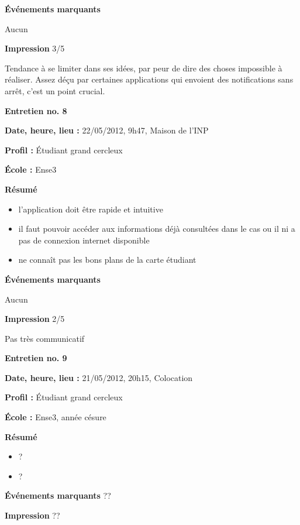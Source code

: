 \documentclass[a4paper, 11px]{article}
\begin{document}
\textbf{Événements marquants}

Aucun

\textbf{Impression} 3/5

Tendance à se limiter dans ses idées, par peur de dire des choses impossible à réaliser. Assez déçu par certaines applications qui envoient des notifications sans arrêt, c'est un point crucial.


\vspace{.3cm}
 \textbf {\large Entretien no. 8}

\textbf{Date, heure, lieu : }
22/05/2012, 9h47, Maison de l'INP

\textbf{Profil : }
Étudiant grand cercleux


\textbf{École : }
Ense3

\textbf{Résumé}
	\begin{itemize}
		\item l'application doit être rapide et intuitive
		\item il faut pouvoir accéder aux informations déjà consultées dans le cas ou il ni a pas de connexion internet disponible
		\item ne connaît pas les bons plans de la carte étudiant
	\end{itemize}
\vspace{.25cm}

\textbf{Événements marquants}

Aucun

\textbf{Impression} 2/5

Pas très communicatif



\vspace{.3cm}

 \textbf {\large Entretien no. 9}

\textbf{Date, heure, lieu : }
21/05/2012, 20h15, Colocation

\textbf{Profil : }
Étudiant grand cercleux

\textbf{École : }
Ense3, année césure

\textbf{Résumé}
	\begin{itemize}
		\item ?
		\item ?
	\end{itemize}

\textbf{Événements marquants}
??

\textbf{Impression}
??

\end{document}
